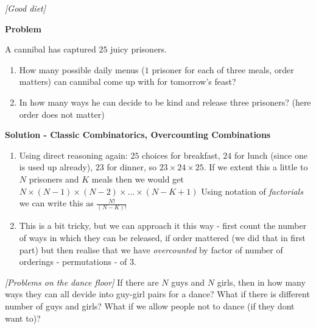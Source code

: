 \begin{problem}
\textit{[Good diet]}

\textbf{Problem}

A cannibal has captured $25$ juicy prisoners.
\begin{enumerate}
\item How many possible daily menus ($1$ prisoner for each of three meals, order matters) can cannibal come up with for tomorrow's feast?
\item In how many ways he can decide to be kind and release three prisoners? (here order does not matter)
\end{enumerate}

\textbf{Solution - Classic Combinatorics, Overcounting Combinations}

\begin{enumerate}
\item Using direct reasoning again: $25$ choices for breakfast, $24$ for lunch (since one is used up already), $23$ for dinner, so $23\times24\times25$. If we extent this a little to $N$ prisoners and $K$ meals then we would get $N\times (N-1) \times (N-2) \times \dots \times (N-K+1)$ Using notation of \textit{factorials} we can write this as $\frac{N!}{(N-K)!}$ 
\item This is a bit tricky, but we can approach it this way - first count the number of ways in which they can be released, if order mattered (we did that in first part) but then realise that we have \textit{overcounted} by factor of number of orderings - permutations - of $3$. 
\end{enumerate}

\end{problem}
%
\filbreak
\begin{problem}
\textit{[Problems on the dance floor]}
If there are $N$ guys and $N$ girls, then in how many ways they can all devide into guy-girl pairs for a dance? What if there is different number of guys and girls? What if we allow people not to dance (if they dont want to)?
\end{problem}
%
\filbreak


